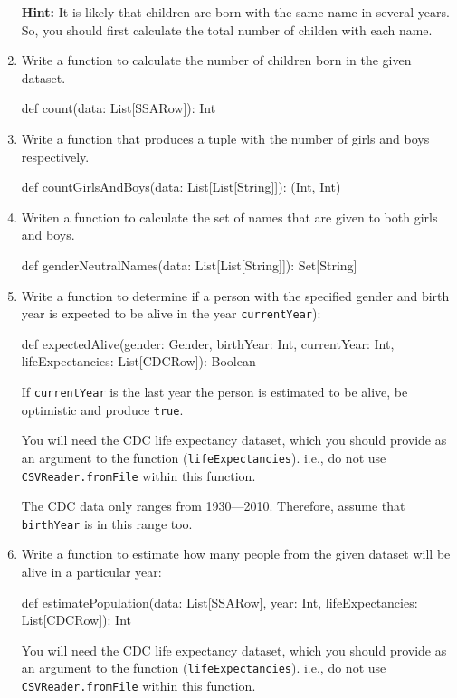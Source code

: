 \documentclass[9pt]{extbook}
\begin{document}
\begin{enumerate}
  \textbf{Hint:} It is likely that children are born with the same
      name in several years. So, you should first calculate the total
      number of childen with each name.
  
  \item Write a function to calculate the number of children born in the given dataset.
  \begin{scalacode}
  def count(data: List[SSARow]): Int
  \end{scalacode}

  \item Write a function that produces a tuple with the number of girls and boys
   respectively.
  \begin{scalacode}
  def countGirlsAndBoys(data: List[List[String]]): (Int, Int)
  \end{scalacode}

  \item Writen a function to calculate the set of names that are given to both girls and boys.
  \begin{scalacode}
  def genderNeutralNames(data: List[List[String]]): Set[String]
  \end{scalacode}


  \item Write a function to determine if a person with the specified gender and birth year
    is expected to be alive in the year  \texttt{currentYear}):

  \begin{scalacode}
  def expectedAlive(gender: Gender, birthYear: Int, currentYear: Int, lifeExpectancies: List[CDCRow]): Boolean 
  \end{scalacode}

  If \texttt{currentYear} is the last year the person is estimated to be alive, be
  optimistic and produce \texttt{true}.

  You will need the CDC life expectancy dataset, which you should provide as an
  argument to the function (\lstinline|lifeExpectancies|).
  i.e., do not use
  \lstinline|CSVReader.fromFile| within this function.

  The CDC data only ranges from 1930---2010. Therefore, assume that
    \texttt{birthYear} is in this range too.


  \item Write a function to estimate how many people from the given dataset
  will be alive in a particular year:

  \begin{scalacode}
  def estimatePopulation(data: List[SSARow], year: Int, lifeExpectancies: List[CDCRow]): Int
  \end{scalacode}

  You will need the CDC life expectancy dataset, which you should provide as an
  argument to the function (\lstinline|lifeExpectancies|). i.e., do not use
  \lstinline|CSVReader.fromFile| within this function.


\end{enumerate}
\end{document}

